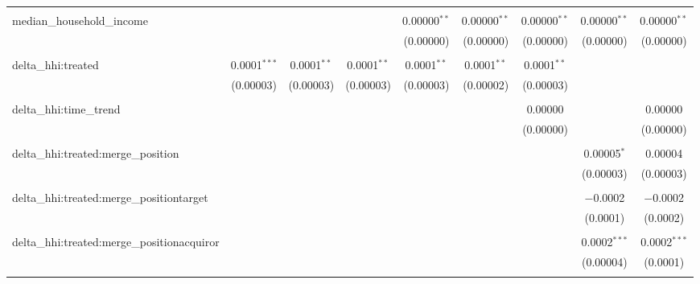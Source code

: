 \begin{table}[H]
{\begin{tabular}{@{\extracolsep{5pt}}lcccccccc}
   & & & & & & & & \\  

  median\_household\_income &  &  &  & 0.00000$^{**}$ & 0.00000$^{**}$ & 0.00000$^{**}$ & 0.00000$^{**}$ & 0.00000$^{**}$ \\  

   &  &  &  & (0.00000) & (0.00000) & (0.00000) & (0.00000) & (0.00000) \\  

   & & & & & & & & \\  

  delta\_hhi:treated & 0.0001$^{***}$ & 0.0001$^{**}$ & 0.0001$^{**}$ & 0.0001$^{**}$ & 0.0001$^{**}$ & 0.0001$^{**}$ &  &  \\  

   & (0.00003) & (0.00003) & (0.00003) & (0.00003) & (0.00002) & (0.00003) &  &  \\  

   & & & & & & & & \\  

  delta\_hhi:time\_trend &  &  &  &  &  & 0.00000 &  & 0.00000 \\  

   &  &  &  &  &  & (0.00000) &  & (0.00000) \\  

   & & & & & & & & \\  

  delta\_hhi:treated:merge\_position &  &  &  &  &  &  & 0.00005$^{*}$ & 0.00004 \\  

   &  &  &  &  &  &  & (0.00003) & (0.00003) \\  

   & & & & & & & & \\  

  delta\_hhi:treated:merge\_positiontarget &  &  &  &  &  &  & $-$0.0002 & $-$0.0002 \\  

   &  &  &  &  &  &  & (0.0001) & (0.0002) \\  

   & & & & & & & & \\  

  delta\_hhi:treated:merge\_positionacquiror &  &  &  &  &  &  & 0.0002$^{***}$ & 0.0002$^{***}$ \\  

   &  &  &  &  &  &  & (0.00004) & (0.0001) \\  

   & & & & & & & & \\  


\end{tabular}}
\end{table}
